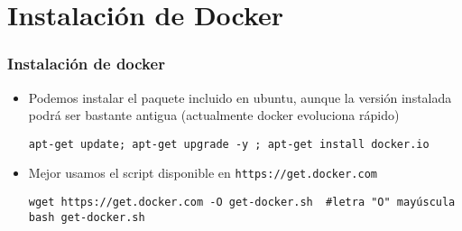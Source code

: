 \documentclass[ucs]{beamer}
\begin{document}
\section{Instalación de Docker}

\begin{frame}[fragile]
\frametitle{Instalación de docker}
\begin{itemize}
\item
Podemos instalar el paquete incluido en ubuntu, aunque la versión instalada
podrá ser bastante antigua (actualmente docker evoluciona rápido)


  \begin{scriptsize}
  \begin{verbatim}
apt-get update; apt-get upgrade -y ; apt-get install docker.io
  \end{verbatim}
  \end{scriptsize}




\item
Mejor usamos el script disponible en
\verb|https://get.docker.com|


  \begin{scriptsize}
  \begin{verbatim}
wget https://get.docker.com -O get-docker.sh  #letra "O" mayúscula
bash get-docker.sh
  \end{verbatim}
  \end{scriptsize}


\end{itemize}

\end{frame}
\end{document}
